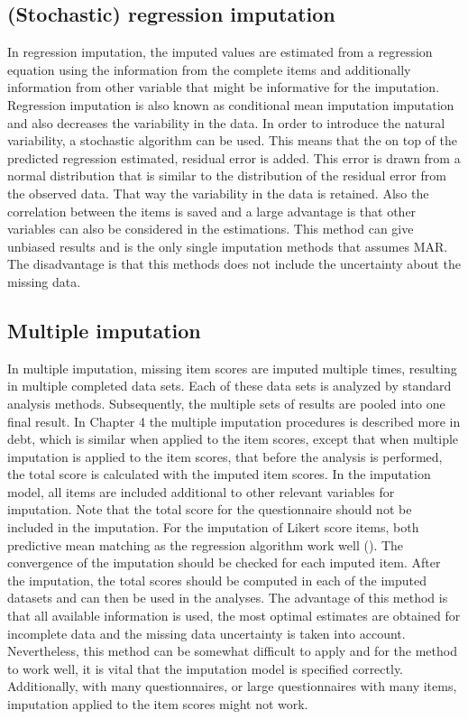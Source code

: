 \documentclass[]{book}
\begin{document}
\subsection{(Stochastic) regression
imputation}\label{stochastic-regression-imputation-1}

In regression imputation, the imputed values are estimated from a
regression equation using the information from the complete items and
additionally information from other variable that might be informative
for the imputation. Regression imputation is also known as conditional
mean imputation imputation and also decreases the variability in the
data. In order to introduce the natural variability, a stochastic
algorithm can be used. This means that the on top of the predicted
regression estimated, residual error is added. This error is drawn from
a normal distribution that is similar to the distribution of the
residual error from the observed data. That way the variability in the
data is retained. Also the correlation between the items is saved and a
large advantage is that other variables can also be considered in the
estimations. This method can give unbiased results and is the only
single imputation methods that assumes MAR. The disadvantage is that
this methods does not include the uncertainty about the missing data.

\subsection{Multiple imputation}\label{multiple-imputation-1}

In multiple imputation, missing item scores are imputed multiple times,
resulting in multiple completed data sets. Each of these data sets is
analyzed by standard analysis methods. Subsequently, the multiple sets
of results are pooled into one final result. In Chapter 4 the multiple
imputation procedures is described more in debt, which is similar when
applied to the item scores, except that when multiple imputation is
applied to the item scores, that before the analysis is performed, the
total score is calculated with the imputed item scores. In the
imputation model, all items are included additional to other relevant
variables for imputation. Note that the total score for the
questionnaire should not be included in the imputation. For the
imputation of Likert score items, both predictive mean matching as the
regression algorithm work well (\citet{Eekhout2014}). The convergence of
the imputation should be checked for each imputed item. After the
imputation, the total scores should be computed in each of the imputed
datasets and can then be used in the analyses. The advantage of this
method is that all available information is used, the most optimal
estimates are obtained for incomplete data and the missing data
uncertainty is taken into account. Nevertheless, this method can be
somewhat difficult to apply and for the method to work well, it is vital
that the imputation model is specified correctly. Additionally, with
many questionnaires, or large questionnaires with many items, imputation
applied to the item scores might not work.
\end{document}
